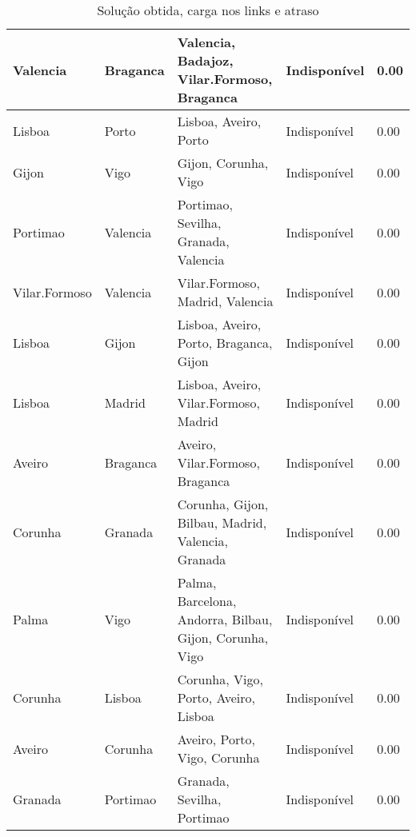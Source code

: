 \begin{table}[!htb]
{\begin{tabular}{|l|l|l|l|l|}
Valencia & Braganca & Valencia, Badajoz, Vilar.Formoso, Braganca & Indisponível & 0.00 \\ \hline
Lisboa & Porto & Lisboa, Aveiro, Porto & Indisponível & 0.00 \\ \hline
Gijon & Vigo & Gijon, Corunha, Vigo & Indisponível & 0.00 \\ \hline
Portimao & Valencia & Portimao, Sevilha, Granada, Valencia & Indisponível & 0.00 \\ \hline
Vilar.Formoso & Valencia & Vilar.Formoso, Madrid, Valencia & Indisponível & 0.00 \\ \hline
Lisboa & Gijon & Lisboa, Aveiro, Porto, Braganca, Gijon & Indisponível & 0.00 \\ \hline
Lisboa & Madrid & Lisboa, Aveiro, Vilar.Formoso, Madrid & Indisponível & 0.00 \\ \hline
Aveiro & Braganca & Aveiro, Vilar.Formoso, Braganca & Indisponível & 0.00 \\ \hline
Corunha & Granada & Corunha, Gijon, Bilbau, Madrid, Valencia, Granada & Indisponível & 0.00 \\ \hline
Palma & Vigo & Palma, Barcelona, Andorra, Bilbau, Gijon, Corunha, Vigo & Indisponível & 0.00 \\ \hline
Corunha & Lisboa & Corunha, Vigo, Porto, Aveiro, Lisboa & Indisponível & 0.00 \\ \hline
Aveiro & Corunha & Aveiro, Porto, Vigo, Corunha & Indisponível & 0.00 \\ \hline
Granada & Portimao & Granada, Sevilha, Portimao & Indisponível & 0.00 \\ \hline
\end{tabular}}
\caption[]{Solução obtida, carga nos links e atraso}
\end{table}

